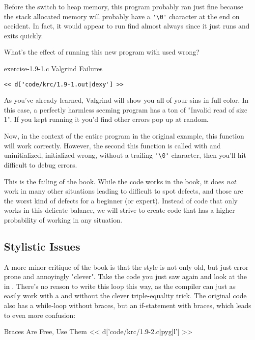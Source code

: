 Before the switch to heap memory, this program probably ran just fine
because the stack allocated memory will probably have a \verb|'\0'| character
at the end on accident.  In fact, it would appear to run find almost always
since it just runs and exits quickly.

What's the effect of running this new program with  used wrong?

\begin{code}{exercise-1.9-1.c Valgrind Failures}
\begin{lstlisting}
<< d['code/krc/1.9-1.out|dexy'] >>
\end{lstlisting}
\end{code}

As you've already learned, Valgrind will show you all of your sins in full
color.  In this case, a perfectly harmless seeming program has a ton of
"Invalid read of size 1".  If you kept running it you'd find other errors pop
up at random.

Now, in the context of the entire program in the original \krc example, this function
will work correctly.  However, the second this function is called with
 and  uninitialized, initialized wrong, 
without a trailing \verb|'\0'| character, then you'll hit difficult to debug
errors.

This is the failing of the book.  While the code works in the book, it does
\emph{not} work in many other situations leading to difficult to spot defects,
and those are the worst kind of defects for a beginner (or expert).
Instead of code that only works in this delicate balance, we will strive to
create code that has a higher probability of working in any situation.


\subsection{Stylistic Issues}

A more minor critique of the book is that the style is not only old, but just
error prone and annoyingly "clever".  Take the code you just saw again and look
at the  in .  There's no reason to write this
loop this way, as the compiler can just as easily work with a 
and without the clever triple-equality trick.  The original code also
has a while-loop without braces, but an if-statement with braces, which
leads to even more confusion:

\begin{code}{Braces Are Free, Use Them}
<< d['code/krc/1.9-2.c|pyg|l'] >>
\end{code}

